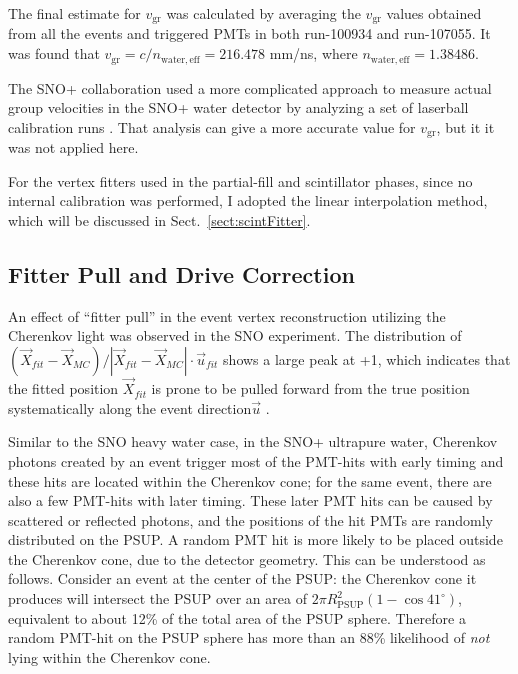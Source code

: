 The final estimate for $v_\mathrm{gr}$ was calculated by averaging the $v_\mathrm{gr}$ values obtained from all the events and triggered PMTs in both run-100934 and run-107055. It was found that $v_\mathrm{gr}=c/n_\mathrm{water,eff}=216.478$ mm/ns, where $n_\mathrm{water,eff}=1.38486$.

The SNO+ collaboration used a more complicated approach to measure actual group velocities in the SNO+ water detector by analyzing a set of laserball calibration runs \cite{anderson2021optical,groupVmeasure}. That analysis can give a more accurate value for $v_\mathrm{gr}$, but it it was not applied here.

For the vertex fitters used in the partial-fill and scintillator phases, since no internal calibration was performed, I adopted the linear interpolation method, which will be discussed in Sect.~\ref{sect:scintFitter}.

\subsection{Fitter Pull and Drive Correction}\label{sect:fitterPull}

An effect of ``fitter pull'' in the event vertex reconstruction utilizing the Cherenkov light was observed in the SNO experiment. The distribution of $(\vec{X}_{fit}-\vec{X}_{MC})/|\vec{X}_{fit}-\vec{X}_{MC}|\cdot \vec{u}_{fit}$ shows a large peak at +1, which indicates that the fitted position $\vec{X}_{fit}$ is prone to be pulled forward from the true position systematically along the event direction$\vec{u}$ \cite{driveCorPeter,brice1996monte,coulter2013modelling}. 

Similar to the SNO heavy water case, in the SNO+ ultrapure water, Cherenkov photons created by an event trigger most of the PMT-hits with early timing and these hits are located within the Cherenkov cone; for the same event, there are also a few PMT-hits with later timing. These later PMT hits can be caused by scattered or reflected photons, and the positions of the hit PMTs are randomly distributed on the PSUP. A random PMT hit is more likely to be placed outside the Cherenkov cone, due to the detector geometry. This can be understood as follows. Consider an event at the center of the PSUP: the Cherenkov cone it produces will intersect the PSUP over an area of $2\pi R^2_\mathrm{PSUP}(1-\cos41^\circ)$, equivalent to about 12\% of the total area of the PSUP sphere. Therefore a random PMT-hit on the PSUP sphere has more than an 88\% likelihood of {\em not} lying within the Cherenkov cone. 

